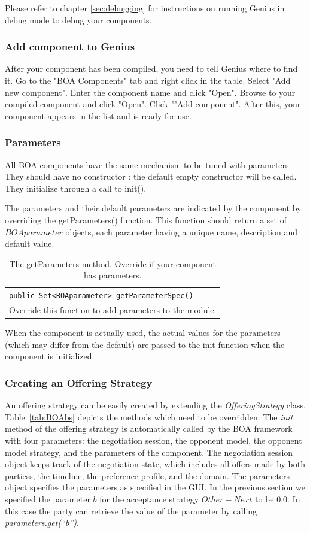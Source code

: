 \documentclass[]{article}
\newcommand\Genius{{\sc Genius}}
\begin{document}
Please refer to chapter \ref{sec:debugging} for instructions on running {\Genius} in debug mode to debug your components. 

\subsubsection{Add component to Genius}
After your component has been compiled, you need to tell Genius where to find it.
Go to the "BOA Components" tab and right click in the table. Select "Add new component". Enter the component name and click "Open". Browse to your compiled component and click "Open". Click ""Add component". After this, your component appears in the list and is ready for use.  

\subsubsection{Parameters}
All BOA components have the same mechanism to be tuned with parameters. They should have no constructor : the default empty constructor will be called. They initialize through a call to init().

The parameters and their default parameters are indicated by the component by overriding the getParameters() function. This function should return a set of $BOAparameter$ objects, each parameter having a unique name, description and default value.


\begin{table}[h]
\begin{tabular}{m{}}
\hline
\texttt{public Set<BOAparameter> getParameterSpec() }\\
 Override this function to add parameters to the module.\\
\hline
\end{tabular}
\caption{The getParameters method. Override if your component has parameters.}
\label{tab:parameters}
\end{table}


When the component is actually used, the actual values for the parameters (which may differ from the default) are passed to the init function when the component is initialized.

\subsubsection{Creating an Offering Strategy}
An offering strategy can be easily created by extending the \textit{OfferingStrategy} class. Table~\ref{tab:BOAbs} depicts the methods which need to be overridden. The \textit{init} method of the offering strategy is automatically called by the BOA framework with four parameters: the negotiation session, the opponent model, the opponent model strategy, and the parameters of the component. The negotiation session object keeps track of the negotiation state, which includes all offers made by both partiess, the timeline, the preference profile, and the domain. The parameters object specifies the parameters as specified in the GUI. In the previous section we specified the parameter $b$ for the acceptance strategy $Other - Next$ to be 0.0. In this case the party can retrieve the value of the parameter by calling \textit{parameters.get(``b'')}.
\end{document}

